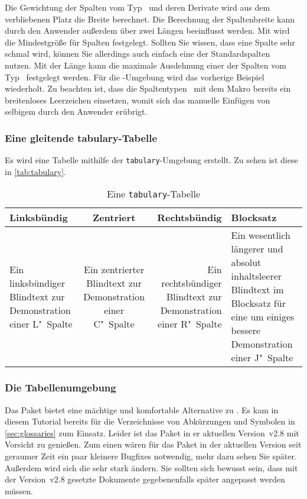 \documentclass[%
  english,ngerman,%
  geometry=no,DIV=12,automark,%
]{tudscrartcl}
\begin{document}
Die Gewichtung der Spalten vom Typ~ und deren Derivate wird aus 
dem verbliebenen Platz die Breite berechnet. Die Berechnung der Spaltenbreite 
kann durch den Anwender außerdem über zwei Längen beeinflusst werden. Mit 
 wird die Mindestgröße für Spalten festgelegt. Sollten Sie 
wissen, dass eine Spalte sehr schmal wird, können Sie allerdings auch einfach 
eine der Standardspalten~ nutzen. Mit der Länge  
kann die maximale Ausdehnung einer der Spalten vom Typ~ festgelegt 
werden. Für die -Umgebung wird das vorherige Beispiel 
wiederholt. Zu beachten ist, dass die Spaltentypen~ mit dem Makro 
 bereits ein breitenloses Leerzeichen einsetzen, womit sich das 
manuelle Einfügen von selbigem durch den Anwender erübrigt.
%
\begin{Trunk+}
\subsubsection{Eine gleitende tabulary-Tabelle}
Es wird eine Tabelle mithilfe der \texttt{tabulary}-Umgebung erstellt. 
Zu sehen ist diese in \autoref{tab:tabulary}. 

\end{Trunk+}
\begin{Trunk}
\begin{table}
\begin{tabulary}{\textwidth}{@{}LCRJ@{}}
\toprule
\textbf{Linksbündig} & \textbf{Zentriert} & 
\textbf{Rechtsbündig} & \textbf{Blocksatz} \tabularnewline
\midrule
Ein linksbündiger Blindtext zur Demonstration einer L"~Spalte &
Ein zentrierter Blindtext zur Demonstration einer C"~Spalte &
Ein rechtsbündiger Blindtext zur Demonstration einer R"~Spalte &
Ein wesentlich längerer und absolut inhaltsleerer Blindtext im 
Blocksatz für eine um einiges bessere Demonstration einer J"~Spalte
\tabularnewline
\bottomrule
\end{tabulary}
\caption{Eine \texttt{tabulary}-Tabelle}\label{tab:tabulary}
\end{table}

\end{Trunk}
\InputCode


\subsubsection{Die Tabellenumgebung }
\label{sec:tabu}
Das Paket  bietet eine mächtige und komfortable Alternative zu 
. Es kam in diesem Tutorial bereits für die Verzeichnisse von 
Abkürzungen und Symbolen in \autoref{sec:glossaries} zum Einsatz. Leider ist 
das Paket in er aktuellen Version~v2.8 mit Vorsicht zu genießen. Zum einen
wären für das Paket in der aktuellen Version seit geraumer Zeit ein paar 
kleinere Bugfixes notwendig, mehr dazu sehen Sie später. Außerdem wird sich die 
 sehr stark ändern. Sie sollten sich bewusst sein, dass mit der Version~v2.8
gesetzte Dokumente gegebenenfalls später angepasst werden müssen.
\end{document}
